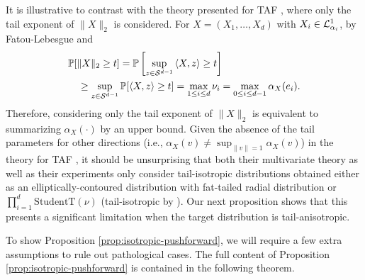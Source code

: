 \documentclass[../../thesis.tex]{subfiles}
\begin{document}
It is illustrative to contrast with the theory presented for TAF \citep{jaini2020tails},
where only the tail exponent of $\|X\|_2$ is considered.
For $X = (X_1, \ldots, X_d)$ with $X_i \in \mathcal{L}^1_{\alpha_i}$,
by Fatou-Lebesgue and 
\begin{align*}
   & \mathbb{P}[\|X\|_2 \geq t]
  = \mathbb{P}\left[\sup_{z \in {\mathcal{S}}^{d-1}} \braket{X,z} \geq t\right]  \\
   & \quad \geq \sup_{z \in {\mathcal{S}}^{d-1}} \mathbb{P}[\braket{X,z} \geq t]
  = \max_{1 \leq i \leq d} \nu_i
  = \max_{0 \leq i \leq d-1} \alpha_X(e_i) .
\end{align*}
Therefore, considering only the tail exponent of $\|X\|_2$ is equivalent to summarizing $\alpha_X(\cdot)$ by an upper bound.
Given the absence of the tail parameters for other directions (i.e., $\alpha_X(v) \neq \sup_{\|v\|=1} \alpha_X(v)$)
in the theory for TAF \citep{jaini2020tails}, it should be unsurprising that both their multivariate
theory as well as their experiments only consider tail-isotropic distributions obtained either
as an elliptically-contoured distribution with fat-tailed radial distribution or
$\prod_{i=1}^d \text{StudentT}(\nu)$ (tail-isotropic by ).
Our next proposition shows that this presents a significant limitation when the target distribution is
tail-anisotropic.



To show Proposition \ref{prop:isotropic-pushforward}, we will require a few extra assumptions to rule out pathological cases. The full content of Proposition \ref{prop:isotropic-pushforward} is contained in the following theorem.
\end{document}
